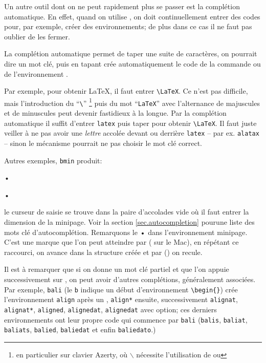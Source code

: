 Un autre outil dont on ne peut rapidement plus se passer est la complétion automatique. En effet, quand on utilise \AllTeX, on doit continuellement entrer des codes pour, par exemple, créer des environnements; de plus dans ce cas il ne faut pas oublier de les fermer.

La complétion automatique permet de taper une suite de caractères, on pourrait dire un mot clé, puis en tapant  \Tw{} crée automatiquement le code de la commande ou de l'environnement \AllTeX.

Par exemple, pour obtenir \og\LaTeX\fg, il faut entrer \verb|\LaTeX|. Ce n'est pas difficile, mais l'introduction du ``\verb|\|'' \footnote{en particulier sur clavier Azerty, où $\backslash$ nécessite l'utilisation de  ou } puis du mot ``\verb|LaTeX|'' avec l'alternance de majuscules et de minuscules peut devenir fastidieux à la longue. Par la complétion automatique il suffit d'entrer \verb|latex| puis taper  pour obtenir \verb|\LaTeX|. Il faut juste veiller à ne pas avoir une \emph{lettre} accolée devant ou derrière \verb|latex| -- par ex. \verb|alatax| -- sinon le mécanisme pourrait ne pas choisir le mot clé correct.

Autres exemples, \verb|bmin| produit:
\begin{verbExample}
\begin{minipage}{}
•
\end{minipage}•
\end{verbExample}
le curseur de saisie se trouve dans la paire d'accolades vide où il faut entrer la dimension de la minipage. Voir la section \ref{sec.autocompletion} pourune liste des mots clé d'autocomplétion.
Remarquons le \og•\fg{} dans l'environnement minipage. C'est une marque que l'on peut atteindre par  ( sur le Mac), en répétant ce raccourci, on avance dans la structure créée et par  () on recule. 

Il est à remarquer que si on donne un mot clé partiel et que l'on appuie successivement sur , on peut avoir d'autres complétions, généralement associées. Par exemple, \verb|bali| (le \verb|b| indique un début d'environnement \verb|\begin{}|) crée l'environnement \verb|align| après un , \verb|align*|	ensuite, successivement \verb|alignat|, \verb|alignat*|, \verb|aligned|, \verb|alignedat|, \verb|alignedat| avec option; ces derniers environnements ont leur propre code qui commence par \verb|bali| (\verb|balis|, \verb|baliat|, \verb|baliats|, \verb|balied|, \verb|baliedat| et enfin \verb|baliedato|.)


